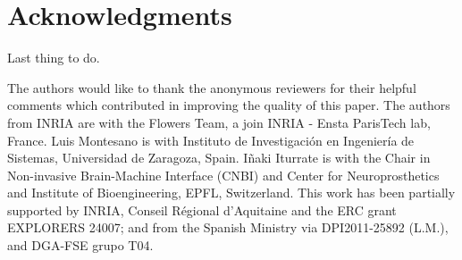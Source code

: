
\section*{Acknowledgments}

Last thing to do.

The authors would like to thank the anonymous reviewers for their helpful comments which contributed in improving the quality of this paper. The authors from INRIA are with the Flowers Team, a join INRIA - Ensta ParisTech lab, France. Luis Montesano is with Instituto de Investigaci\'{o}n en Ingenier\'{i}a de Sistemas, Universidad de Zaragoza, Spain. I\~{n}aki Iturrate is with the Chair in Non-invasive Brain-Machine Interface (CNBI) and Center for Neuroprosthetics and Institute of Bioengineering, EPFL, Switzerland. This work has been partially supported by INRIA, Conseil R\'egional d'Aquitaine and the ERC grant EXPLORERS 24007; and from the Spanish Ministry via DPI2011-25892 (L.M.), and DGA-FSE grupo T04.